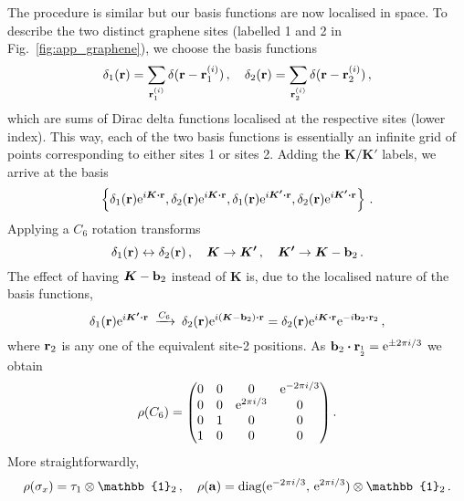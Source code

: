 The procedure is similar but our basis functions are now localised in space. To describe the two distinct graphene sites (labelled 1 and 2 in Fig.~\ref{fig:app_graphene}), we choose the basis functions
\begin{equation}
\delta_1(\vb{r}) = \sum_{\vb{r}^{(i)}_1} \delta(\vb{r} - \vb{r}^{(i)}_1) \,, \quad \delta_2(\vb{r}) = \sum_{\vb{r}^{(i)}_2} \delta(\vb{r} - \vb{r}^{(i)}_2) \,,
\end{equation}
which are sums of Dirac delta functions localised at the respective sites (lower index). This way, each of the two basis functions is essentially an infinite grid of points corresponding to either sites 1 or sites 2. Adding the $\boldsymbol{K} / \boldsymbol{K'}$ labels, we arrive at the basis
\begin{equation}
\left\{ \delta_1(\vb{r}) \e^{i \boldsymbol{K} \vdot \vb{r}}, \delta_2(\vb{r}) \e^{i \boldsymbol{K} \vdot \vb{r}}, \delta_1(\vb{r}) \e^{i \boldsymbol{K'} \vdot \vb{r}}, \delta_2(\vb{r}) \e^{i \boldsymbol{K'} \vdot \vb{r}} \right\} \,.
\end{equation}
%
Applying a $C_6$ rotation transforms
\begin{equation}
 \delta_1(\vb{r}) \leftrightarrow \delta_2(\vb{r}) \,, \quad \boldsymbol{K} \rightarrow \boldsymbol{K'} \,, \quad \boldsymbol{K'} \rightarrow \boldsymbol{K} - \vb{b}_2 \,.
\end{equation}
%
The effect of having $\boldsymbol{K} - \vb{b}_2$ instead of $\boldsymbol{K}$ is, due to the localised nature of the basis functions,
\begin{equation}
\delta_1(\vb{r}) \e^{i \boldsymbol{K'} \vdot \vb{r}} \: \xrightarrow[]{C_6} \:  \delta_2(\vb{r}) \e^{i \left(\boldsymbol{K} - \vb{b}_2 \right) \vdot \vb{r}} = \delta_2(\vb{r}) \e^{i \boldsymbol{K} \vdot \vb{r}} \e^{-i \vb{b}_2 \vdot \vb{r}_2} \,,
\end{equation}
where $\vb{r}_2$ is any one of the equivalent site-2 positions. As $\vb{b}_2 \vdot \vb{r}_{_{2}^{1}} = \e^{\pm 2 \pi i / 3}$ we obtain 
\begin{equation}
\rho(C_6) = \mqty( 0 & 0 & 0 & \e^{-2 \pi i / 3} \\ 0 & 0 & \e^{2 \pi i / 3} & 0 \\ 0 & 1 & 0 & 0 \\ 1 & 0 & 0 & 0) \,.
\end{equation}
%
More straightforwardly,
\begin{equation}
\rho(\sigma_x) = \tau_1 \otimes \mathbb{1}_2 \,, \quad \rho(\vb{a}) = \text{diag}(  \e^{-2 \pi i /3} , \, \e^{2 \pi i /3} ) \otimes \mathbb{1}_2 \,.
\end{equation}
